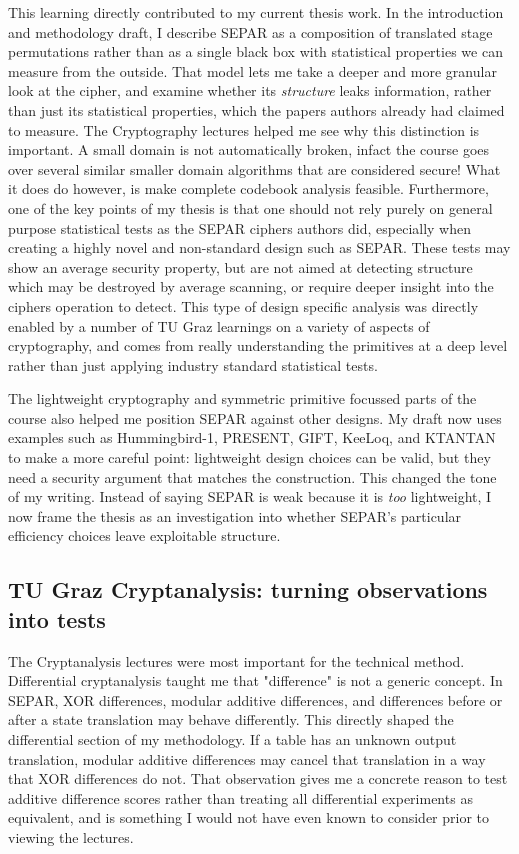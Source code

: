 \documentclass[11pt]{article}
\begin{document}
This learning directly contributed to my current thesis work. In the introduction and methodology draft, I describe SEPAR as a composition of translated stage permutations rather than as a single black box with statistical properties we can measure from the outside. That model lets me take a deeper and more granular look at the cipher, and examine whether its \textit{structure} leaks information, rather than just its statistical properties, which the papers authors already had claimed to measure. The Cryptography lectures helped me see why this distinction is important. A small domain is not automatically broken, infact the course goes over several similar smaller domain algorithms that are considered secure! What it does do however, is make complete codebook analysis feasible. Furthermore, one of the key points of my thesis is that one should not rely purely on general purpose statistical tests as the SEPAR ciphers authors did, especially when creating a highly novel and non-standard design such as SEPAR. These tests may show an average security property, but are not aimed at detecting structure which may be destroyed by average scanning, or require deeper insight into the ciphers operation to detect. This type of design specific analysis was directly enabled by a number of TU Graz learnings on a variety of aspects of cryptography, and comes from really understanding the primitives at a deep level rather than just applying industry standard statistical tests.  

The lightweight cryptography and symmetric primitive focussed parts of the course also helped me position SEPAR against other designs. My draft now uses examples such as Hummingbird-1, PRESENT, GIFT, KeeLoq, and KTANTAN to make a more careful point: lightweight design choices can be valid, but they need a security argument that matches the construction. This changed the tone of my writing. Instead of saying SEPAR is weak because it is \textit{too} lightweight, I now frame the thesis as an investigation into whether SEPAR's particular efficiency choices leave exploitable structure.

\subsection*{TU Graz Cryptanalysis: turning observations into tests}

The Cryptanalysis lectures were most important for the technical method. Differential cryptanalysis taught me that "difference" is not a generic concept. In SEPAR, XOR differences, modular additive differences, and differences before or after a state translation may behave differently. This directly shaped the differential section of my methodology. If a table has an unknown output translation, modular additive differences may cancel that translation in a way that XOR differences do not. That observation gives me a concrete reason to test additive difference scores rather than treating all differential experiments as equivalent, and is something I would not have even known to consider prior to viewing the lectures.
\end{document}
